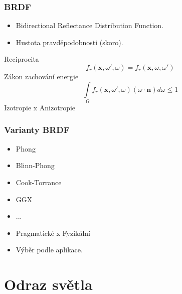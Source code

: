 \begin{frame}
    \frametitle{BRDF}
    \begin{itemize}
        \item Bidirectional Reflectance Distribution Function.
        \item Hustota pravděpodobnosti (skoro).
    \end{itemize}
    \pause\vfill
    Reciprocita
    \begin{equation*}
        f_r(\mathbf x, \omega', \omega) = f_r(\mathbf x, \omega, \omega')
    \end{equation*}
    Zákon zachování energie
    \begin{equation*}
        \int\limits_\Omega f_r(\mathbf x, \omega', \omega) (\omega \cdot \mathbf n) d\omega \le 1
    \end{equation*}
    Izotropie x Anizotropie
\end{frame}

\begin{frame}
    \frametitle{Varianty BRDF}
    \begin{itemize}
        \item Phong
        \item Blinn-Phong
        \item Cook-Torrance
        \item GGX
        \item ...
    \end{itemize}
    \pause\vfill
    \begin{itemize}
        \item Pragmatické x Fyzikální
        \item Výběr podle aplikace.
    \end{itemize}
\end{frame}

\section{Odraz světla}

